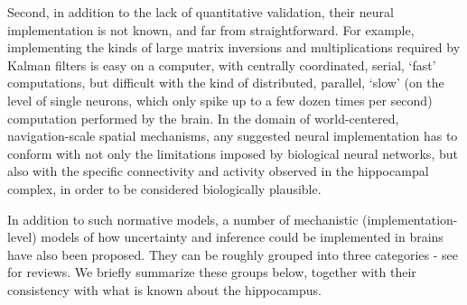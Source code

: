 Second, in addition to the lack of quantitative validation, their neural implementation is not known, and far from straightforward. For example, implementing the kinds of large matrix inversions and multiplications required by Kalman filters \citep{kalman1960new} is easy on a computer, with centrally coordinated, serial, `fast' computations, but difficult with the kind of distributed, parallel, `slow' (on the level of single neurons, which only spike up to a few dozen times per second) computation performed by the brain. In the domain of world-centered, navigation-scale spatial mechanisms, any suggested neural implementation has to conform with not only the limitations imposed by biological neural networks, but also with the specific connectivity and activity observed in the hippocampal complex, in order to be considered biologically plausible.

In addition to such normative models, a number of mechanistic (implementation-level) models of how uncertainty and inference could be implemented in brains have also been proposed. They can be roughly grouped into three categories - see \citep{pouget2013probabilistic, vilares2011bayesian} for reviews. We briefly summarize these groups below, together with their consistency with what is known about the hippocampus. 



